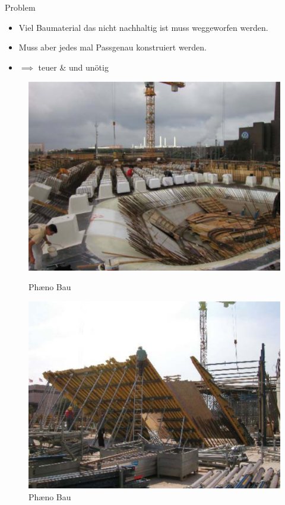 \documentclass{beamer}
\begin{document}
\begin{frame}{Problem}
    \begin{itemize}
        \item Viel Baumaterial das nicht nachhaltig ist muss weggeworfen werden.
        \item Muss aber jedes mal Passgenau konstruiert werden.
        \item $\implies$ teuer \& und un\"otig
    \end{itemize}
    \begin{figure}[H]
        \begin{minipage}{0.4\textwidth}
           \centering
           \vfill
           \includegraphics[width=\linewidth]{figures/beispiele/phaeno-307-1.png}
           \caption{Ph\ae{}no Bau \parencite{mayer}}
           \label{fig:bau-phae-1}
        \end{minipage}
            \hfill
        \begin{minipage}{0.4\textwidth}
           \centering
           \vfill
           \includegraphics[width=\linewidth]{figures/beispiele/phaeno-307-2.png}
           \caption{Ph\ae{}no Bau \parencite{mayer}}
           \label{fig:bau-phae-2}
        \end{minipage}
    \end{figure}
\end{frame}
\end{document}
